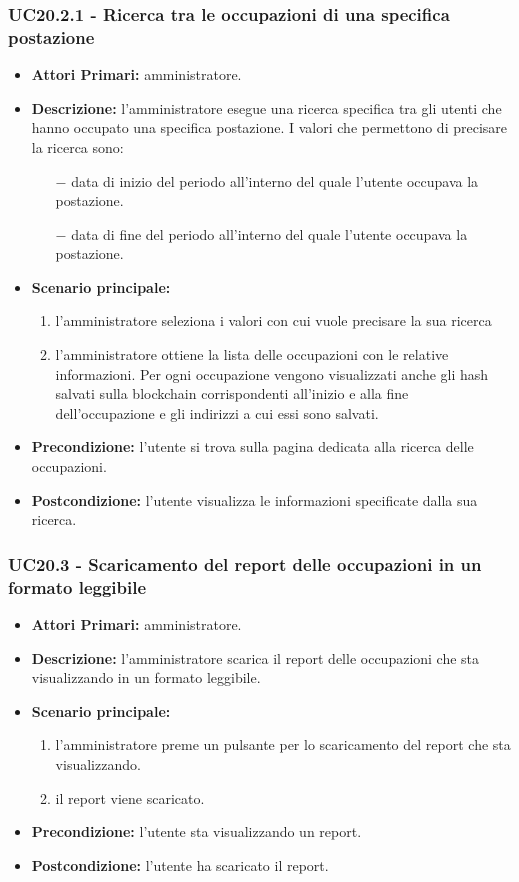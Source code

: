 \subsubsection{ UC20.2.1 - Ricerca tra le occupazioni di una specifica postazione}
\begin{itemize}
	\item\textbf{Attori Primari:} 
	amministratore.
	\item\textbf{Descrizione:} 
	l'amministratore esegue una ricerca specifica tra gli utenti che hanno occupato una specifica postazione.
	I valori che permettono di precisare la ricerca sono:
	\begin{itemize}
		\item[$-$] data di inizio del periodo all'interno del quale l'utente occupava la postazione.
		\item[$-$] data di fine del periodo all'interno del quale l'utente occupava la postazione.
	\end{itemize}
	\item\textbf{Scenario principale:} 
	\begin{enumerate}
		\item l'amministratore seleziona i valori con cui vuole precisare la sua ricerca
		\item l'amministratore ottiene la lista delle occupazioni con le relative informazioni. Per ogni occupazione vengono visualizzati anche gli hash salvati sulla blockchain corrispondenti all'inizio e alla fine dell'occupazione e gli indirizzi a cui essi sono salvati.
	\end{enumerate}
	\item\textbf{Precondizione:} 
	l'utente si trova sulla pagina dedicata alla ricerca delle occupazioni.
	\item\textbf{Postcondizione:}
	l'utente visualizza le informazioni specificate dalla sua ricerca.
\end{itemize}

\subsubsection{ UC20.3 - Scaricamento del report delle occupazioni in un formato leggibile}
\begin{itemize}
	\item\textbf{Attori Primari:} 
	amministratore.
	\item\textbf{Descrizione:} 
	l'amministratore scarica il report delle occupazioni che sta visualizzando in un formato leggibile.
	\item\textbf{Scenario principale:} 
	\begin{enumerate}
		\item l'amministratore preme un pulsante per lo scaricamento del report che sta visualizzando.
		\item il report viene scaricato.
	\end{enumerate}
	\item\textbf{Precondizione:} 
	l'utente sta visualizzando un report.
	\item\textbf{Postcondizione:}
	l'utente ha scaricato il report.
\end{itemize}

